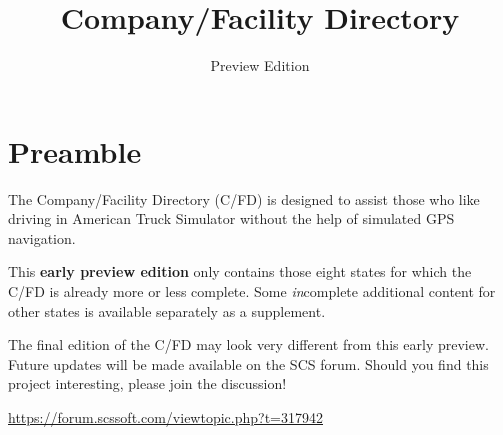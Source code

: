 
\subject{City location descriptions for ATS}
\title{Company\!/Facility Directory}
\subtitle{Preview Edition}




\maketitle

\vspace{5mm}
\section*{Preamble}

{
\justifying

The Company/Facility Directory (C/FD) is designed to assist those who like driving in American Truck Simulator without the help of simulated GPS navigation.

This \textbf{early preview edition} only contains those eight states for which the C/FD is already more or less complete.
Some \emph{in}complete additional content for other states is available separately as a supplement.



The final edition of the C/FD may look very different from this early preview.
Future updates will be made available on the SCS forum.
Should you find this project interesting, please join the discussion!

\centering \vspace{1ex}
\url{https://forum.scssoft.com/viewtopic.php?t=317942} \par
}

